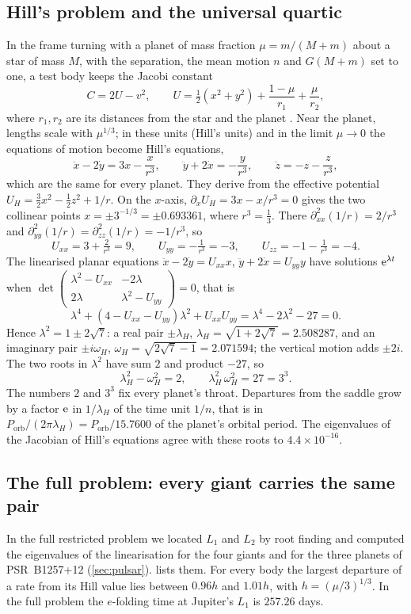 \documentclass[11pt]{article}
\theoremstyle{definition}\newtheorem{definition}[theorem]{Definition}
\theoremstyle{remark}\newtheorem{remark}[theorem]{Remark}
\begin{document}
\subsection{Hill's problem and the universal quartic}\label{sec:hill}
In the frame turning with a planet of mass fraction $\mu=m/(M+m)$ about a star of mass $M$, with the separation, the mean motion $n$ and $G(M+m)$ set to one, a test body keeps the Jacobi constant
\[
C=2U-v^2,\qquad U=\tfrac12(x^2+y^2)+\frac{1-\mu}{r_1}+\frac{\mu}{r_2},
\]
where $r_1,r_2$ are its distances from the star and the planet \cite{MD}. Near the planet, lengths scale with $\mu^{1/3}$; in these units (Hill's units) and in the limit $\mu\to0$ the equations of motion become Hill's equations,
\[
\ddot x-2\dot y=3x-\frac{x}{r^3},\qquad \ddot y+2\dot x=-\frac{y}{r^3},\qquad \ddot z=-z-\frac{z}{r^3},
\]
which are the same for every planet. They derive from the effective potential $U_H=\frac32x^2-\frac12z^2+1/r$. On the $x$-axis, $\partial_xU_H=3x-x/r^3=0$ gives the two collinear points $x=\pm3^{-1/3}=\pm0.693361$, where $r^3=\frac13$. There $\partial^2_{xx}(1/r)=2/r^3$ and $\partial^2_{yy}(1/r)=\partial^2_{zz}(1/r)=-1/r^3$, so
\[
U_{xx}=3+\tfrac2{r^3}=9,\qquad U_{yy}=-\tfrac1{r^3}=-3,\qquad U_{zz}=-1-\tfrac1{r^3}=-4 .
\]
The linearised planar equations $\ddot x-2\dot y=U_{xx}x$, $\ddot y+2\dot x=U_{yy}y$ have solutions $\mathrm e^{\lambda t}$ when $\det\begin{pmatrix}\lambda^2-U_{xx}&-2\lambda\\2\lambda&\lambda^2-U_{yy}\end{pmatrix}=0$, that is
\begin{equation}\label{eq:quartic}
\lambda^4+(4-U_{xx}-U_{yy})\lambda^2+U_{xx}U_{yy}=\lambda^4-2\lambda^2-27=0 .
\end{equation}
Hence $\lambda^2=1\pm2\sqrt7$: a real pair $\pm\lambda_H$, $\lambda_H=\sqrt{1+2\sqrt7}=2.508287$, and an imaginary pair $\pm i\omega_H$, $\omega_H=\sqrt{2\sqrt7-1}=2.071594$; the vertical motion adds $\pm2i$. The two roots in $\lambda^2$ have sum $2$ and product $-27$, so
\[
\lambda_H^2-\omega_H^2=2,\qquad \lambda_H^2\,\omega_H^2=27=3^3 .
\]
The numbers $2$ and $3^3$ fix every planet's throat. Departures from the saddle grow by a factor $\mathrm e$ in $1/\lambda_H$ of the time unit $1/n$, that is in $P_\mathrm{orb}/(2\pi\lambda_H)=P_\mathrm{orb}/15.7600$ of the planet's orbital period. The eigenvalues of the Jacobian of Hill's equations agree with these roots to $4.4\times10^{-16}$.

\subsection{The full problem: every giant carries the same pair}\label{sec:full}
In the full restricted problem we located $L_1$ and $L_2$ by root finding and computed the eigenvalues of the linearisation for the four giants and for the three planets of PSR~B1257+12 (\cref{sec:pulsar}).  lists them. For every body the largest departure of a rate from its Hill value lies between $0.96h$ and $1.01h$, with $h=(\mu/3)^{1/3}$. In the full problem the $e$-folding time at Jupiter's $L_1$ is $257.26$ days.
\end{document}
